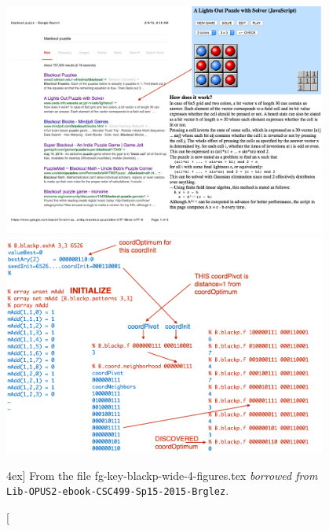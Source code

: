 \begin{figure}[t!]
\begin{minipage}{0.49\textwidth}
\includegraphics[width=0.95\textwidth]{fg-key-blackp-descr-a}
\end{minipage}
%
\begin{minipage}{0.49\textwidth}
\includegraphics[width=0.95\textwidth]{fg-key-blackp-neighbors}
\end{minipage}

\caption[From the file fg-key-blackp-wide-4-figures.tex][4ex]
{From the file fg-key-blackp-wide-4-figures.tex {\em borrowed from} {\tt Lib-OPUS2-ebook-CSC499-Sp15-2015-Brglez}.
}
\label{fg-key-blackp-wide-4-figures}
\end{figure}
